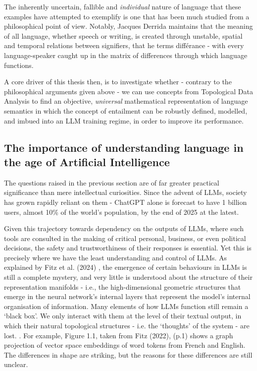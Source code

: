 \documentclass[12pt,twoside]{report}
\begin{document}
The inherently uncertain, fallible and \textit{individual} nature of language that these examples have attempted to exemplify is one  that has been much studied from a philosophical point of view. Notably, Jacques Derrida \cite{derrida1, derrida2, derrida3} maintains that the meaning of all language, whether speech or writing, is created through unstable, spatial and temporal relations between signifiers, that he terms différance - with every language-speaker caught up in the matrix of differences through which language functions. \newline \par

A core driver of this thesis then, is to investigate whether - contrary to the philosophical arguments given above - we can use concepts from Topological Data Analysis to find an objective, \textit{universal} mathematical representation of language semantics in which the concept of entailment can be robustly defined, modelled, and imbued into an LLM training regime, in order to improve its performance.


\subsection{The importance of understanding language in the age of Artificial Intelligence}
The questions raised in the previous section are of far greater practical significance than mere intellectual curiosities. Since the advent of LLMs, society has grown rapidly reliant on them - ChatGPT alone is forecast to have 1 billion users, almost 10\% of the world's population, by the end of 2025 at the latest. \cite{forbesChatGPT} \newline \par

Given this trajectory towards dependency on the outputs of LLMs, where such tools are consulted in the making of critical personal, business, or even political decisions, the safety and trustworthiness of their responses is essential. Yet this is precisely where we have the least understanding and control of LLMs. As explained by Fitz et al. (2024) \cite{fitz2024hiddenholestopologicalaspects}, the emergence of certain behaviours in LLMs is still a complete mystery, and very little is understood about the structure of their representation manifolds - i.e., the high-dimensional geometric structures that emerge in the neural network's internal layers that represent the model's internal organisation of information. Many elements of how LLMs function still remain a `black box'. We only interact with them at the level of their textual output, in which their natural topological structures - i.e. the `thoughts' of the system - are lost. \cite{fitz2024hiddenholestopologicalaspects}. For example, Figure 1.1, taken from Fitz (2022), \cite{fitz22a} (p.1) shows a graph projection of vector space embeddings of word tokens from French and English. The differences in shape are striking, but the reasons for these differences are still unclear. \newline
\end{document}
